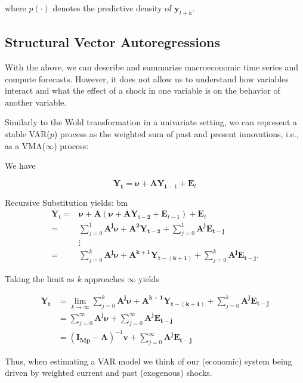 where $p(\cdot)$ denotes the predictive density of $\bm{y}_{t+h}$.

\subsection{Structural Vector Autoregressions}

With the above, we can describe and summarize macroeconomic time series and compute forecasts. However, it does not allow us to understand how variables interact and what the effect of a shock in one variable is on the behavior of another variable.

Similarly to the Wold transformation in a univariate setting, we can represent a stable VAR($p$) process as the weighted sum of past and present innovations, i.e., as a VMA($\infty$) process:

We have

\[
\bm{Y}_{\bm{t}}=\bm{\nu}+\bm{AY}_{\bm{t}-1}+\bm{E}_{t}
\]

Recursive Substitution yields:
bm
\begin{align*}
\bm{Y}_{\mathfrak{t}}= & \bm{\nu}+\bm{A}\left(\bm{\nu}+\bm{A} \bm{Y}_{\mathfrak{t}-\bm{2}}+\bm{E}_{t-1}\right)+\bm{E}_t \\
= & \sum_{j=0}^1 \bm{A}^{\bm{j}} \bm{\nu}+\bm{A}^{\bm{2}} \bm{Y}_{\bm{t}-\bm{2}}+\sum_{j=0}^1 \bm{A}^{\bm{j}} \bm{E}_{\bm{t}-\bm{j}} \\
& \vdots \\
= & \sum_{j=0}^k \bm{A}^{\bm{j}} \bm{\nu}+\bm{A}^{\bm{k}+\bm{1}} \bm{Y}_{\bm{t}-(\bm{k}+\bm{1})}+\sum_{j=0}^k \bm{A}^{\bm{j}} \bm{E}_{\bm{t}-\bm{j}} .
\end{align*}

Taking the limit as $k$ approaches $\infty$ yields

\begin{align*}
\bm{Y}_{\bm{t}} & =\lim _{k \rightarrow \infty} \sum_{j=0}^k \bm{A}^{\bm{j}} \bm{\nu}+\bm{A}^{\bm{k}+\bm{1}} \bm{Y}_{\bm{t}-(\bm{k}+\bm{1})}+\sum_{j=0}^k \bm{A}^{\bm{j}} \bm{E}_{\bm{t}-\bm{j}} \\
& =\sum_{j=0}^{\infty} \bm{A}^{\bm{j}} \bm{\nu}+\sum_{j=0}^{\infty} \bm{A}^{\bm{j}} \bm{E}_{\bm{t}-\bm{j}} \\
& =\left(\bm{I}_{\bm{M p}}-\bm{A}\right)^{-1} \bm{v}+\sum_{j=0}^{\infty} \bm{A}^{\bm{j}} \bm{E}_{\bm{t}-\bm{j}}
\end{align*}

Thus, when estimating a VAR model we think of our (economic) system being driven by weighted current and past (exogenous) shocks.

